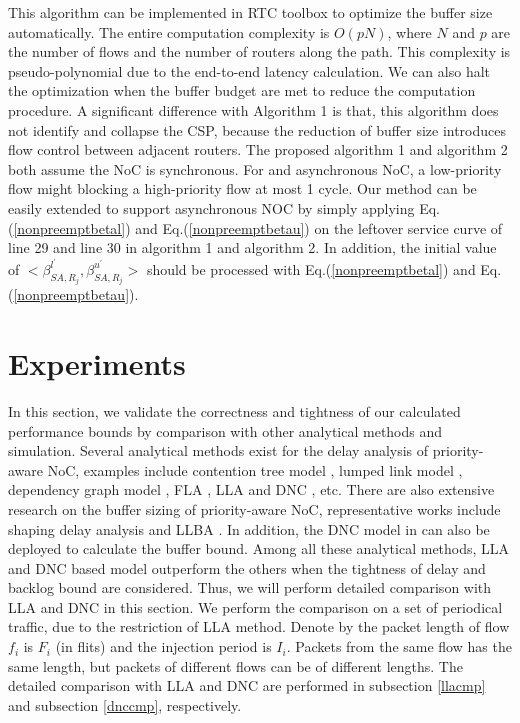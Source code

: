 \documentclass[10pt,journal]{IEEEtran}
\begin{document}
This algorithm can be implemented in RTC toolbox \cite{rtc} to optimize the buffer size automatically. The entire computation complexity is $O(pN)$, where $N$ and $p$ are the number of flows and the number of routers along the path. This complexity is pseudo-polynomial due to the end-to-end latency calculation. We can also halt the optimization when the buffer budget are met to reduce the computation procedure. A significant difference with Algorithm 1 is that, this algorithm does not identify and collapse the CSP, because the reduction of buffer size introduces flow control between adjacent routers. The proposed algorithm 1 and algorithm 2 both assume the NoC is synchronous. For and asynchronous NoC, a low-priority flow might blocking a high-priority flow at most 1 cycle. Our method can be easily extended to support asynchronous NOC by simply applying Eq.(\ref{nonpreemptbetal}) and Eq.(\ref{nonpreemptbetau}) on the leftover service curve of line 29 and line 30 in algorithm 1 and algorithm 2. In addition, the initial value of $<\beta_{SA,R_j}^{l^\prime},\beta_{SA,R_j}^{u^\prime}>$ should be processed with Eq.(\ref{nonpreemptbetal}) and Eq.(\ref{nonpreemptbetau}).

\section{Experiments}\label{experiments}
In this section, we validate the correctness and tightness of our calculated performance bounds by comparison with other analytical methods and simulation. Several analytical methods exist for the delay analysis of priority-aware NoC, examples include contention tree model \cite{LuJS05}, lumped link model \cite{707545}, dependency graph model \cite{708526}, FLA \cite{Shi:2008:RCA:1397757.1397996}, LLA \cite{73} and DNC \cite{Qian489900}, etc. There are also extensive research on the buffer sizing of priority-aware NoC, representative works include shaping delay analysis \cite{Manolache:2006:BSO:1131481.1131683} and LLBA \cite{189}. In addition, the DNC model in \cite{Qian489900} can also be deployed to calculate the buffer bound. Among all these analytical methods, LLA and DNC based model outperform the others when the tightness of delay and backlog bound are considered. Thus, we will perform detailed comparison with LLA and DNC in this section. We perform the comparison on a set of periodical traffic, due to the restriction of LLA method. Denote by the packet length of flow $f_i$ is $F_i$ (in flits) and the injection period is $I_i$. Packets from the same flow has the same length, but packets of different flows can be of different lengths. The detailed comparison with LLA and DNC are performed in subsection \ref{llacmp} and subsection \ref{dnccmp}, respectively.
\end{document}
